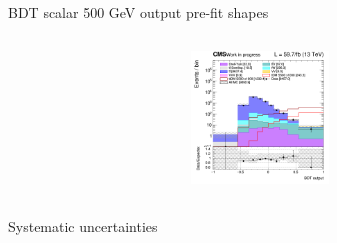 \documentclass[8pt]{beamer}
\begin{document}
\begin{frame}{BDT scalar 500 GeV output pre-fit shapes}
\begin{columns}
\begin{column}{0.33\textwidth}
\begin{center}
     			\includegraphics[width=1.0\textwidth, height=100pt]{figs/2018/SmearSR-ttDM-scalar500/log_cratio_TTbar_topCR_ll_BDT_ttDM500_TTbar_BDT_output_scalar500_customBinsAttempt7.png}
    		\end{center}		
		\end{column}
\end{columns} \vfill
\end{frame}















\begin{frame}[standout]
Systematic uncertainties
\end{frame}
\end{document}
